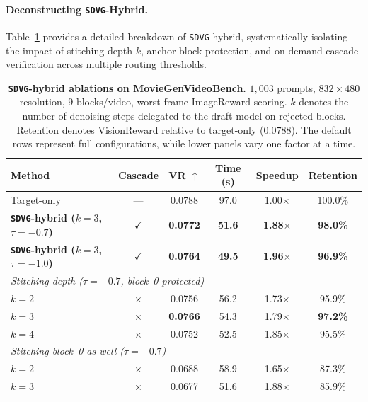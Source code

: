 \documentclass{article} %
\begin{document}
\paragraph{Deconstructing \texttt{SDVG}-Hybrid.}
Table~\ref{tab:hybrid} provides a detailed breakdown of \texttt{SDVG}-hybrid, systematically isolating the impact of stitching depth $k$, anchor-block protection, and on-demand cascade verification across multiple routing thresholds.

\begin{table}[t]
  \caption{%
    \textbf{\texttt{SDVG}-hybrid ablations on MovieGenVideoBench.}
    $1{,}003$ prompts, $832{\times}480$ resolution, $9$ blocks/video, worst-frame ImageReward scoring.
    $k$ denotes the number of denoising steps delegated to the draft model on rejected blocks.
    Retention denotes VisionReward relative to target-only ($0.0788$).
    The default rows represent full configurations, while lower panels vary one factor at a time.
  }
  \label{tab:hybrid}
  \centering
  \setlength{\tabcolsep}{6pt}
  \begin{tabular}{lccccc}
    \toprule
    Method & Cascade & VR $\uparrow$ & Time (s) & Speedup & Retention \\
    \midrule
    Target-only & --- & 0.0788 & 97.0 & 1.00$\times$ & 100.0\% \\
    \midrule
    \textbf{\texttt{SDVG}-hybrid ($k{=}3$, $\tau{=}{-}0.7$)}
      & $\checkmark$ & \textbf{0.0772} & \textbf{51.6} & \textbf{1.88$\times$} & \textbf{98.0\%} \\
    \textbf{\texttt{SDVG}-hybrid ($k{=}3$, $\tau{=}{-}1.0$)}
      & $\checkmark$ & \textbf{0.0764} & \textbf{49.5} & \textbf{1.96$\times$} & \textbf{96.9\%} \\
    \midrule
    \multicolumn{6}{l}{\textit{Stitching depth ($\tau{=}{-}0.7$, block~0 protected)}} \\
    $k{=}2$ & $\times$ & 0.0756 & 56.2 & 1.73$\times$ & 95.9\% \\
    $k{=}3$ & $\times$ & \textbf{0.0766} & 54.3 & 1.79$\times$ & \textbf{97.2\%} \\
    $k{=}4$ & $\times$ & 0.0752 & 52.5 & 1.85$\times$ & 95.5\% \\
    \midrule
    \multicolumn{6}{l}{\textit{Stitching block~0 as well ($\tau{=}{-}0.7$)}} \\
    $k{=}2$ & $\times$ & 0.0688 & 58.9 & 1.65$\times$ & 87.3\% \\
    $k{=}3$ & $\times$ & 0.0677 & 51.6 & 1.88$\times$ & 85.9\% \\

\end{tabular}
\end{table}
\end{document}

